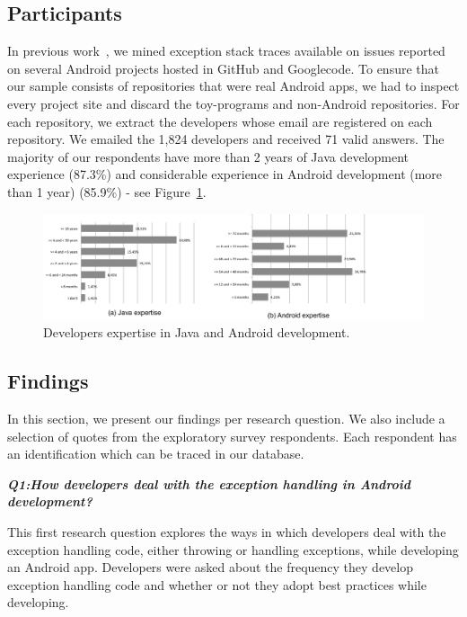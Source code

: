 \subsection{Participants}

 In previous work~\cite{coelhoetal15}, we mined exception stack traces available on issues reported on several Android projects hosted in GitHub and Googlecode. To ensure that our sample consists of repositories that were real Android apps, we had to inspect every project site and discard the toy-programs and non-Android repositories. For each repository, we extract the developers whose email are registered on each repository. We emailed the 1,824 developers and received 71 valid answers. The majority of our respondents have more than 2 years of Java development experience (87.3\%) and  considerable experience in Android development (more than 1 year)  (85.9\%) - see Figure~\ref{fig:devexpertise}.

\begin{figure} \centering \includegraphics[scale=0.35]{charts/expertise.png}
\caption{Developers expertise in Java and Android development.}
\label{fig:devexpertise}
\end{figure}

\subsection{Findings}

In this section, we present our findings per research question. 
We also include a selection of quotes from the exploratory survey 
respondents. Each respondent has an identification which can be traced in our database. 

\bigskip
\noindent\emph{\textbf{Q1:How developers deal with the exception handling in Android development?}}
\bigskip

This first research question explores the ways in which developers deal with the exception handling code, either throwing or handling exceptions,  while developing an Android app.  Developers were asked about the frequency they develop exception handling code and whether or not they adopt best practices while developing.

